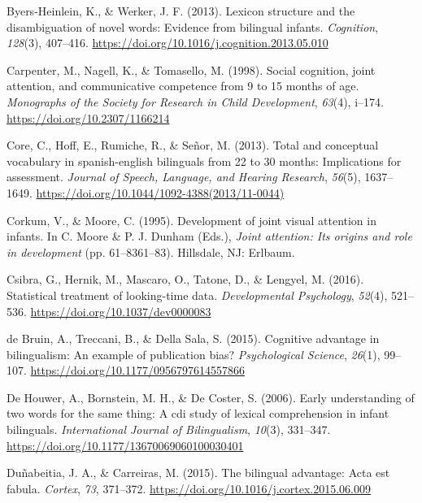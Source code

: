 \documentclass[english,,man,floatsintext]{apa6}
\begin{document}
\leavevmode\hypertarget{ref-Byers-Heinlein_Werker_2013}{}%
Byers-Heinlein, K., \& Werker, J. F. (2013). Lexicon structure and the disambiguation of novel words: Evidence from bilingual infants. \emph{Cognition}, \emph{128}(3), 407--416. \url{https://doi.org/10.1016/j.cognition.2013.05.010}

\leavevmode\hypertarget{ref-Carpenter_etal_1998}{}%
Carpenter, M., Nagell, K., \& Tomasello, M. (1998). Social cognition, joint attention, and communicative competence from 9 to 15 months of age. \emph{Monographs of the Society for Research in Child Development}, \emph{63}(4), i--174. \url{https://doi.org/10.2307/1166214}

\leavevmode\hypertarget{ref-Core_etal_2013}{}%
Core, C., Hoff, E., Rumiche, R., \& Señor, M. (2013). Total and conceptual vocabulary in spanish-english bilinguals from 22 to 30 months: Implications for assessment. \emph{Journal of Speech, Language, and Hearing Research}, \emph{56}(5), 1637--1649. \url{https://doi.org/10.1044/1092-4388(2013/11-0044)}

\leavevmode\hypertarget{ref-Corkum_Moore_1995}{}%
Corkum, V., \& Moore, C. (1995). Development of joint visual attention in infants. In C. Moore \& P. J. Dunham (Eds.), \emph{Joint attention: Its origins and role in development} (pp. 61--8361--83). Hillsdale, NJ: Erlbaum.

\leavevmode\hypertarget{ref-Csibra_etal_2016}{}%
Csibra, G., Hernik, M., Mascaro, O., Tatone, D., \& Lengyel, M. (2016). Statistical treatment of looking-time data. \emph{Developmental Psychology}, \emph{52}(4), 521--536. \url{https://doi.org/10.1037/dev0000083}

\leavevmode\hypertarget{ref-deBruin_etal_2015}{}%
de Bruin, A., Treccani, B., \& Della Sala, S. (2015). Cognitive advantage in bilingualism: An example of publication bias? \emph{Psychological Science}, \emph{26}(1), 99--107. \url{https://doi.org/10.1177/0956797614557866}

\leavevmode\hypertarget{ref-DeHouwer_etal_2006}{}%
De Houwer, A., Bornstein, M. H., \& De Coster, S. (2006). Early understanding of two words for the same thing: A cdi study of lexical comprehension in infant bilinguals. \emph{International Journal of Bilingualism}, \emph{10}(3), 331--347. \url{https://doi.org/10.1177/13670069060100030401}

\leavevmode\hypertarget{ref-Dunabeitia_Carreiras_2015}{}%
Duñabeitia, J. A., \& Carreiras, M. (2015). The bilingual advantage: Acta est fabula. \emph{Cortex}, \emph{73}, 371--372. \url{https://doi.org/10.1016/j.cortex.2015.06.009}
\end{document}
